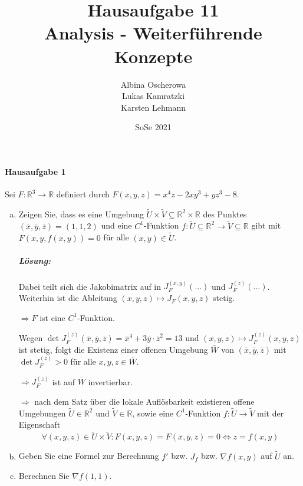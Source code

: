 \documentclass{scrreprt}
\author{Albina Oscherowa \\ Lukas Kamratzki \\ Karsten Lehmann}
\date{SoSe 2021}
\title{Hausaufgabe 11 \\Analysis - Weiterführende Konzepte}
\begin{document}
\paragraph{Hausaufgabe 1} Sei $F \colon \mathbb{R}^3 \to \mathbb{R}$
definiert durch $F(x, y, z) = x^4z - 2xy^3 + yz^3 - 8$.
\begin{enumerate}[a)]
\item Zeigen Sie, dass es eine Umgebung
  $\tilde{U} \times \tilde{V} \subseteq \mathbb{R}^2 \times \mathbb{R}$
  des Punktes $(\overline{x}, \overline{y}, \overline{z}) = (1, 1, 2)$
  und eine $C^1$-Funktion
  $f \colon \tilde{U} \subseteq \mathbb{R}^2 \to \tilde{V} \subseteq \mathbb{R}$
  gibt mit $F(x, y, f(x, y)) = 0$ für alle $(x, y) \in \tilde{U}$.

  \subparagraph{Lösung:}
  Dabei teilt sich die Jakobimatrix auf in
  \colorbox{red!40}{$J_F^{(x,y)} (\ldots)$} und
  \colorbox{blue!40}{$J_F^{(z)} (\ldots)$}.
  Weiterhin ist die Ableitung $(x, y, z) \mapsto J_F(x, y, z)$ stetig.

  $\Rightarrow F$ ist eine $C^1$-Funktion.

  Wegen
  $\det J_F^{(z)}(\overline{x}, \overline{y}, \overline{z}) =
  \overline{x}^4 + 3\overline{y} \cdot \overline{z}^2 = 13$ und
  $(x, y, z) \mapsto J_F^{(z)}(x, y, z)$ ist stetig, folgt die
  Existenz einer offenen Umgebung $\overline{W}$ von
  $(\overline{x}, \overline{y}, \overline{z})$ mit
  $\det J_F^{(z)} > 0$ für alle $x, y, z \in \overline{W}$.

  $\Rightarrow J_F^{(z)}$ ist auf $\overline{W}$ invertierbar.

  $\Rightarrow$ nach dem Satz über die lokale Auflösbarkeit existieren
  offene Umgebungen $\tilde{U} \in \mathbb{R}^2$ und $\tilde{V} \in \mathbb{R}$,
  sowie eine $C^1$-Funktion $f \colon \tilde{U} \to \tilde{V}$
  mit der Eigenschaft
  \[
    \forall (x, y, z) \in \tilde{U} \times \tilde{V} \colon
    F(x, y, z) = F(\overline{x}, \overline{y}, \overline{z}) = 0
    \iff z = f(x, y)
  \]

\item Geben Sie eine Formel zur Berechnung $f'$ bzw. $J_f$ bzw.
  $\nabla f(x, y)$ auf $\tilde{U}$ an.

\item Berechnen Sie $\nabla f(1, 1)$.
\end{enumerate}
\end{document}
